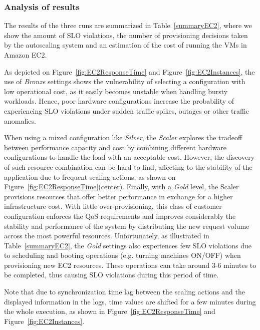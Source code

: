 \subsubsection{Analysis of results}
The results of the three runs are summarized in Table~\ref{summaryEC2}, where we show the amount of SLO violations, the number of provisioning decisions taken by the autoscaling system and an estimation of the cost of running the VMs in Amazon EC2.

As depicted on Figure~\ref{fig:EC2ResponseTime} and Figure~\ref{fig:EC2Instances}, the use of \emph{Bronze} settings shows the vulnerability of selecting a configuration with low operational cost, as it easily becomes unstable when handling bursty workloads. Hence, poor hardware configurations increase the probability of experiencing SLO violations under sudden traffic spikes, outages or other traffic anomalies. 

When using a mixed configuration like \emph{Silver}, the \emph{Scaler} explores the tradeoff between performance capacity and cost by combining different hardware configurations to handle the load with an acceptable cost. However, the discovery of such resource combination can be hard-to-find, affecting to the stability of the application due to frequent scaling actions, as shown on Figure~\ref{fig:EC2ResponseTime}(center). Finally, with a \emph{Gold} level, the Scaler provisions resources that offer better performance in exchange for a higher infrastructure cost. With little over-provisioning, this class of customer configuration enforces the QoS requirements and improves considerably the stability and performance of the system by distributing the new request volume across the most powerful resources. Unfortunately, as illustrated in Table~\ref{summaryEC2}, the \emph{Gold} settings also experiences few SLO violations due to scheduling and booting operations (e.g. turning machines ON/OFF) when provisioning new EC2 resources. These operations can take around 3-6 minutes to be completed, thus causing SLO violations during this period of time.

Note that due to synchronization time lag between the scaling actions and the displayed information in the logs, time values are shifted for a few minutes during the whole execution, as shown in Figure~\ref{fig:EC2ResponseTime} and Figure~\ref{fig:EC2Instances}.



